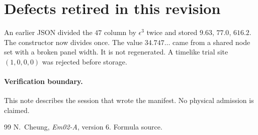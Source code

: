 \documentclass[11pt,letterpaper]{article}
\begin{document}
\section{Defects retired in this revision}
An earlier JSON divided the \(47\) column by \(\epsilon^3\) twice and
stored \(9.63\), \(77.0\), \(616.2\).
The constructor now divides once.
The value \(34.747\ldots\) came from a shared node set with a broken
panel width. It is not regenerated.
A timelike trial site \((1,0,0,0)\) was rejected before storage.

\paragraph{Verification boundary.}
This note describes the session that wrote the manifest.
No physical admission is claimed.

\begin{thebibliography}{99}
N.~Cheung, \emph{Em02-A}, version 6. Formula source.
\end{thebibliography}
\end{document}
